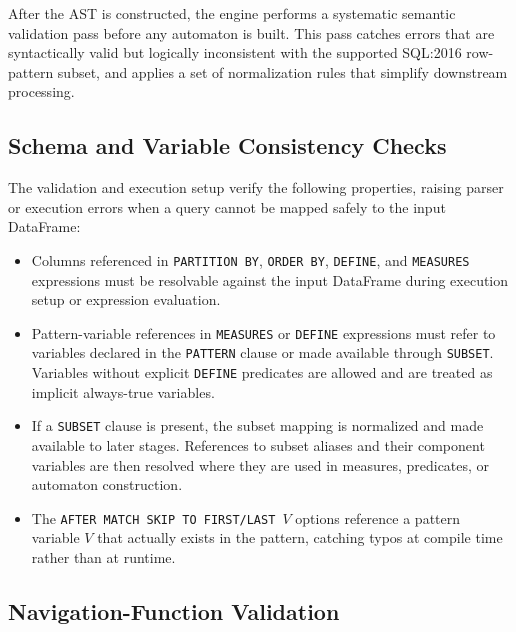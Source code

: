 After the AST is constructed, the engine performs a systematic
semantic validation pass before any automaton is built.  This pass
catches errors that are syntactically valid but logically
inconsistent with the supported SQL:2016 row-pattern subset, and
applies a set of normalization rules that simplify downstream
processing.

\subsection{Schema and Variable Consistency Checks}
\label{subsec:sem-schema}

The validation and execution setup verify the following properties,
raising parser or execution errors when a query cannot be mapped
safely to the input DataFrame:

\begin{itemize}
  \item Columns referenced in \texttt{PARTITION BY},
    \texttt{ORDER BY}, \texttt{DEFINE}, and \texttt{MEASURES}
    expressions must be resolvable against the input DataFrame during
    execution setup or expression evaluation.

  \item Pattern-variable references in \texttt{MEASURES} or
    \texttt{DEFINE} expressions must refer to variables declared in
    the \texttt{PATTERN} clause or made available through
    \texttt{SUBSET}.  Variables without explicit \texttt{DEFINE}
    predicates are allowed and are treated as implicit always-true
    variables.

  \item If a \texttt{SUBSET} clause is present, the subset mapping is
    normalized and made available to later stages.  References to
    subset aliases and their component variables are then resolved
    where they are used in measures, predicates, or automaton
    construction.

  \item The \texttt{AFTER MATCH SKIP TO FIRST/LAST $V$} options
    reference a pattern variable $V$ that actually exists in the
    pattern, catching typos at compile time rather than at runtime.
\end{itemize}

\subsection{Navigation-Function Validation}
\label{subsec:sem-navfunc}

